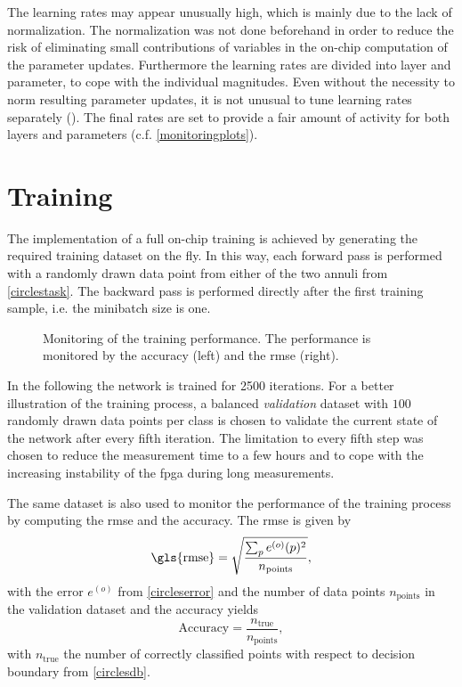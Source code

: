 The learning rates may appear unusually high, which is mainly due to the lack of normalization. The normalization was not done beforehand in order to reduce the risk of eliminating small contributions of variables in the on-chip computation of the parameter updates. Furthermore the learning rates are divided into layer and parameter, to cope with the individual magnitudes. Even without the necessity to norm resulting parameter updates, it is not unusual to tune learning rates separately (\citealp{Goodfellow-et-al-2016}). The final rates are set to provide a fair amount of activity for both layers and parameters (c.f. \cref{monitoringplots}).

\section{Training}
The implementation of a full on-chip training is achieved by generating the required training dataset on the fly. In this way, each forward pass is performed with a randomly drawn data point from either of the two annuli from \cref{circlestask}. The backward pass is performed directly after the first training sample, i.e. the minibatch size is one.

\begin{figure}
	\begin{center}
		
	\end{center}
	\caption[Monitoring of the training performance.]{Monitoring of the training performance. The performance is monitored by the accuracy (left) and the \acrfull{rmse} (right).}
	\label{circles_acc}
\end{figure}

In the following the network is trained for 2500 iterations. For a better illustration of the training process, a balanced \emph{validation} dataset with $100$ randomly drawn data points per class is chosen to validate the current state of the network after every fifth iteration. The limitation to every fifth step was chosen to reduce the measurement time to a few hours and to cope with the increasing instability of the \gls{fpga} during long measurements.

The same dataset is also used to monitor the performance of the training process by computing the \gls{rmse} and the accuracy. The \gls{rmse} is given by
\begin{equation}
\text{\gls{rmse}} = \sqrt{\frac{\sum_p e^{(o)}(p)^2}{n_\text{points}}},
\end{equation}
with the error $e^{(o)}$ from \cref{circleserror} and the number of data points $n_\text{points}$ in the validation dataset and the accuracy yields
\begin{equation}
\text{Accuracy} = \frac{n_\text{true}}{n_\text{points}},
\end{equation}
with $n_\text{true}$ the number of correctly classified points with respect to decision boundary from \cref{circlesdb}.

